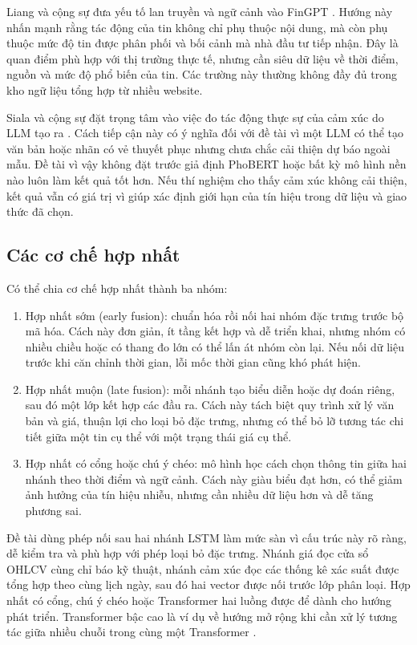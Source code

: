 Liang và cộng sự đưa yếu tố lan truyền và ngữ cảnh vào FinGPT
\cite{Liang2024_241210823v2}. Hướng này nhấn mạnh rằng tác động của tin không chỉ phụ
thuộc nội dung, mà còn phụ thuộc mức độ tin được phân phối và bối cảnh mà nhà đầu tư
tiếp nhận. Đây là quan điểm phù hợp với thị trường thực tế, nhưng cần siêu dữ liệu về
thời điểm, nguồn và mức độ phổ biến của tin. Các trường này thường không đầy đủ trong
kho ngữ liệu tổng hợp từ nhiều website.

Siala và cộng sự đặt trọng tâm vào việc đo tác động thực sự của cảm xúc do LLM tạo
ra \cite{Siala2026_260200086v3}. Cách tiếp cận này có ý nghĩa đối với đề tài vì một
LLM có thể tạo văn bản hoặc nhãn có vẻ thuyết phục nhưng chưa chắc cải thiện dự báo ngoài
mẫu. Đề tài vì vậy không đặt trước giả định PhoBERT hoặc bất kỳ mô hình nền nào luôn làm
kết quả tốt hơn. Nếu thí nghiệm cho thấy cảm xúc không cải thiện, kết quả vẫn có giá
trị vì giúp xác định giới hạn của tín hiệu trong dữ liệu và giao thức đã chọn.

\subsection{Các cơ chế hợp nhất}

Có thể chia cơ chế hợp nhất thành ba nhóm:

\begin{enumerate}[nosep]
  \item Hợp nhất sớm (early fusion): chuẩn hóa rồi nối hai nhóm đặc trưng trước bộ mã hóa.
    Cách này đơn giản, ít tầng kết hợp và dễ triển khai, nhưng nhóm có nhiều chiều hoặc
    có thang đo lớn có thể lấn át nhóm còn lại. Nếu nối dữ liệu trước khi căn chỉnh
    thời gian, lỗi mốc thời gian cũng khó phát hiện.
  \item Hợp nhất muộn (late fusion): mỗi nhánh tạo biểu diễn hoặc dự đoán riêng, sau đó một
    lớp kết hợp các đầu ra. Cách này tách biệt quy trình xử lý văn bản và giá, thuận
    lợi cho loại bỏ đặc trưng, nhưng có thể bỏ lỡ tương tác chi tiết giữa một tin cụ thể với
    một trạng thái giá cụ thể.
  \item Hợp nhất có cổng hoặc chú ý chéo: mô hình học cách chọn thông tin
    giữa hai nhánh theo thời điểm và ngữ cảnh. Cách này giàu biểu đạt hơn, có thể giảm
    ảnh hưởng của tín hiệu nhiễu, nhưng cần nhiều dữ liệu hơn và dễ tăng phương sai.
\end{enumerate}

Đề tài dùng phép nối sau hai nhánh LSTM làm mức sàn vì cấu trúc này rõ ràng, dễ kiểm tra
và phù hợp với phép loại bỏ đặc trưng. Nhánh giá đọc cửa sổ OHLCV cùng chỉ báo kỹ thuật, nhánh
cảm xúc đọc các thống kê xác suất được tổng hợp theo cùng lịch ngày, sau đó hai vector
được nối trước lớp phân loại. Hợp nhất có cổng, chú ý chéo hoặc Transformer hai luồng được
để dành cho hướng phát triển. Transformer bậc cao là ví dụ về hướng mở rộng khi
cần xử lý tương tác giữa nhiều chuỗi trong cùng một Transformer
\cite{Omranpour2024_241210540v1}.

